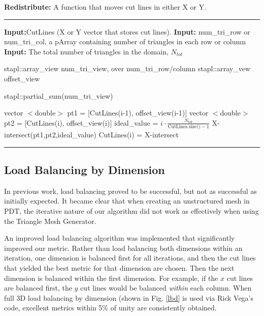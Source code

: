 \documentclass[11pt, letterpaper,titlepage,oneside]{article}
\begin{document}
\noindent\begin{minipage}{\textwidth}
\textbf{Redistribute:} A function that moves cut lines in either X or Y. \\
\rule{\textwidth}{0.4pt}
\begin{algorithmic}
\STATE \textbf{Input:}CutLines (X or Y vector that stores cut lines). 
\STATE \textbf{Input:} num\_tri\_row or num\_tri\_col, a pArray containing number of triangles in each row or column 
\STATE \textbf{Input:} The total number of triangles in the domain, $N_{tot}$

\STATE stapl::array\_view num\_tri\_view, over num\_tri\_row/column
\STATE stapl::array\_vew offset\_view

\STATE stapl::partial\_sum(num\_tri\_view) 



	\STATE vector $<$double$>$ pt1 = [CutLines(i-1), offset\_view(i-1)]
	\STATE vector $<$double$>$ pt2 = [CutLines(i), offset\_view(i)]
	\STATE ideal\_value = $i\cdot \frac{N_{tot}}{\text{CutLines.size()}-1}$
	\STATE X-intersect(pt1,pt2,ideal\_value) 
	\STATE CutLines(i) = X-intersect
\ENDFOR
\end{algorithmic}
\rule{\textwidth}{0.4pt}
\end{minipage}

\subsection{Load Balancing by Dimension}

In previous work, load balancing proved to be successful, but not as successful as initially expected. It became clear that when creating an unstructured mesh in PDT, the iterative nature of our algorithm did not work as effectively when using the Triangle Mesh Generator. 

An improved load balancing algorithm was implemented that significantly improved our metric. Rather than load balancing both dimensions within an iteration, one dimension is balanced first for all iterations, and then the cut lines that yielded the best metric for that dimension are chosen. Then the next dimension is balanced within the first dimension. For example, if the $x$ cut lines are balanced first, the $y$ cut lines would be balanced \textit{within} each column. When full 3D load balancing by dimension (shown in Fig. \ref{lbd} is used via Rick Vega's code, excellent metrics within 5\% of unity are consistently obtained.
\end{document}
